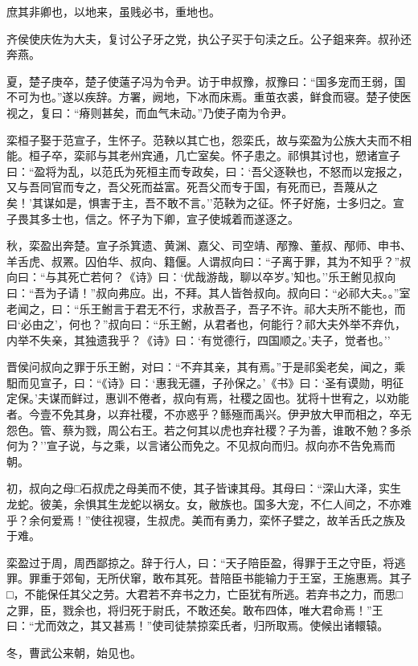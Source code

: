 \documentclass[]{article}
\begin{document}
庶其非卿也，以地来，虽贱必书，重地也。

齐侯使庆佐为大夫，复讨公子牙之党，执公子买于句渎之丘。公子鉏来奔。叔孙还奔燕。

夏，楚子庚卒，楚子使薳子冯为令尹。访于申叔豫，叔豫曰：``国多宠而王弱，国不可为也。''遂以疾辞。方署，阙地，下冰而床焉。重茧衣裘，鲜食而寝。楚子使医视之，复曰：``瘠则甚矣，而血气未动。''乃使子南为令尹。

栾桓子娶于范宣子，生怀子。范鞅以其亡也，怨栾氏，故与栾盈为公族大夫而不相能。桓子卒，栾祁与其老州宾通，几亡室矣。怀子患之。祁惧其讨也，愬诸宣子曰：``盈将为乱，以范氏为死桓主而专政矣，曰：`吾父逐鞅也，不怒而以宠报之，又与吾同官而专之，吾父死而益富。死吾父而专于国，有死而已，吾蔑从之矣！'其谋如是，惧害于主，吾不敢不言。''范鞅为之征。怀子好施，士多归之。宣子畏其多士也，信之。怀子为下卿，宣子使城着而遂逐之。

秋，栾盈出奔楚。宣子杀箕遗、黄渊、嘉父、司空靖、邴豫、董叔、邴师、申书、羊舌虎、叔罴。囚伯华、叔向、籍偃。人谓叔向曰：``子离于罪，其为不知乎？''叔向曰：``与其死亡若何？《诗》曰：`优哉游哉，聊以卒岁。'知也。''乐王鲋见叔向曰：``吾为子请！''叔向弗应。出，不拜。其人皆咎叔向。叔向曰：``必祁大夫。。''室老闻之，曰：``乐王鲋言于君无不行，求赦吾子，吾子不许。祁大夫所不能也，而曰`必由之'，何也？''叔向曰：``乐王鲋，从君者也，何能行？祁大夫外举不弃仇，内举不失亲，其独遗我乎？《诗》曰：`有觉德行，四国顺之。'夫子，觉者也。''

晋侯问叔向之罪于乐王鲋，对曰：``不弃其亲，其有焉。''于是祁奚老矣，闻之，乘馹而见宣子，曰：``《诗》曰：`惠我无疆，子孙保之。'《书》曰：`圣有谟勋，明征定保。'夫谋而鲜过，惠训不倦者，叔向有焉，社稷之固也。犹将十世宥之，以劝能者。今壹不免其身，以弃社稷，不亦惑乎？鲧殛而禹兴。伊尹放大甲而相之，卒无怨色。管、蔡为戮，周公右王。若之何其以虎也弃社稷？子为善，谁敢不勉？多杀何为？''宣子说，与之乘，以言诸公而免之。不见叔向而归。叔向亦不告免焉而朝。

初，叔向之母□石叔虎之母美而不使，其子皆谏其母。其母曰：``深山大泽，实生龙蛇。彼美，余惧其生龙蛇以祸女。女，敝族也。国多大宠，不仁人间之，不亦难乎？余何爱焉！''使往视寝，生叔虎。美而有勇力，栾怀子嬖之，故羊舌氏之族及于难。

栾盈过于周，周西鄙掠之。辞于行人，曰：``天子陪臣盈，得罪于王之守臣，将逃罪。罪重于郊甸，无所伏窜，敢布其死。昔陪臣书能输力于王室，王施惠焉。其子□，不能保任其父之劳。大君若不弃书之力，亡臣犹有所逃。若弃书之力，而思□之罪，臣，戮余也，将归死于尉氏，不敢还矣。敢布四体，唯大君命焉！''王曰：``尤而效之，其又甚焉！''使司徒禁掠栾氏者，归所取焉。使候出诸轘辕。

冬，曹武公来朝，始见也。
\end{document}
